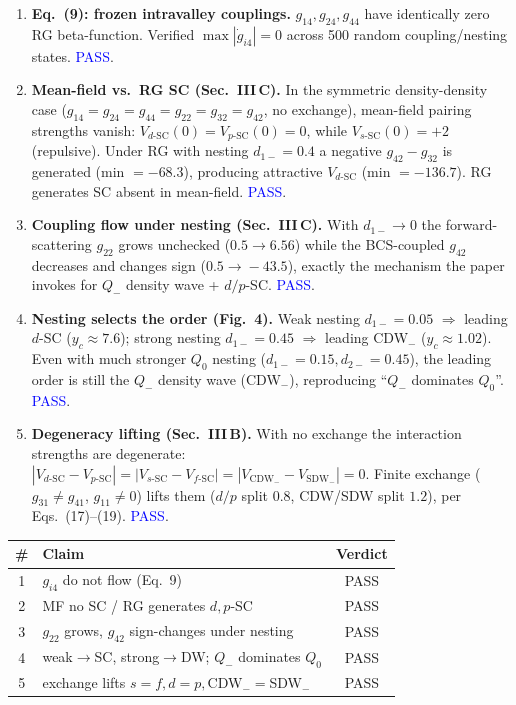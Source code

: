 \documentclass[11pt]{article}
\begin{document}
\begin{enumerate}
\item \textbf{Eq.~(9): frozen intravalley couplings.} $g_{14},g_{24},g_{44}$ have
identically zero RG beta-function. Verified $\max|\dot g_{i4}|=0$ across 500 random
coupling/nesting states. \textcolor{blue}{PASS}.

\item \textbf{Mean-field vs.\ RG SC (Sec.~III\,C).} In the symmetric
density-density case ($g_{14}{=}g_{24}{=}g_{44}{=}g_{22}{=}g_{32}{=}g_{42}$, no
exchange), mean-field pairing strengths vanish: $V_{d\text{-SC}}(0)=V_{p\text{-SC}}(0)=0$,
while $V_{s\text{-SC}}(0)=+2$ (repulsive). Under RG with nesting $d_{1-}=0.4$ a
negative $g_{42}-g_{32}$ is generated (min $=-68.3$), producing attractive
$V_{d\text{-SC}}$ (min $=-136.7$). RG generates SC absent in mean-field.
\textcolor{blue}{PASS}.

\item \textbf{Coupling flow under nesting (Sec.~III\,C).} With $d_{1-}\!\to\!0$ the
forward-scattering $g_{22}$ grows unchecked ($0.5\!\to\!6.56$) while the
BCS-coupled $g_{42}$ decreases and changes sign ($0.5\!\to\!-43.5$), exactly the
mechanism the paper invokes for $Q_-$ density wave + $d/p$-SC.
\textcolor{blue}{PASS}.

\item \textbf{Nesting selects the order (Fig.~4).} Weak nesting $d_{1-}=0.05$
$\Rightarrow$ leading $d$-SC ($y_c\approx7.6$); strong nesting $d_{1-}=0.45$
$\Rightarrow$ leading CDW$_-$ ($y_c\approx1.02$). Even with much stronger $Q_0$
nesting ($d_{1-}=0.15,d_{2-}=0.45$), the leading order is still the $Q_-$ density
wave (CDW$_-$), reproducing ``$Q_-$ dominates $Q_0$''. \textcolor{blue}{PASS}.

\item \textbf{Degeneracy lifting (Sec.~III\,B).} With no exchange the interaction
strengths are degenerate: $|V_{d\text{-SC}}-V_{p\text{-SC}}|=|V_{s\text{-SC}}-V_{f\text{-SC}}|
=|V_{\text{CDW}_-}-V_{\text{SDW}_-}|=0$. Finite exchange ($g_{31}\neq g_{41}$,
$g_{11}\neq0$) lifts them ($d/p$ split $0.8$, CDW/SDW split $1.2$), per
Eqs.~(17)--(19). \textcolor{blue}{PASS}.
\end{enumerate}

\begin{center}
\begin{tabular}{clc}
\toprule
\# & Claim & Verdict \\
\midrule
1 & $g_{i4}$ do not flow (Eq.~9) & PASS \\
2 & MF no SC / RG generates $d,p$-SC & PASS \\
3 & $g_{22}$ grows, $g_{42}$ sign-changes under nesting & PASS \\
4 & weak$\to$SC, strong$\to$DW; $Q_-$ dominates $Q_0$ & PASS \\
5 & exchange lifts $s{=}f,d{=}p,$CDW$_-{=}$SDW$_-$ & PASS \\
\bottomrule
\end{tabular}
\end{center}
\end{document}
